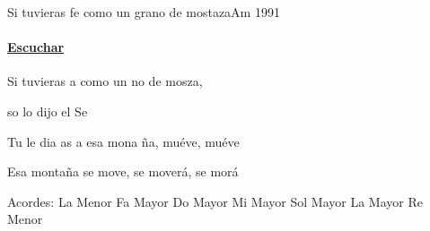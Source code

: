 \documentclass[12pt, spanish]{book}
\newcommand{\NotCCLIed}{\relax}
\begin{document}
    \begin{song}{Si tuvieras fe como un grano de mostaza}{Am}
        {1991} %
        {}
        {} %
        {} %
        \ifChordBk
        \paragraph{\mbox{}\hfill\protect\href{https://open.spotify.com/intl-es/track/082jtoJ1ot609KqSNEyhyX}{Escuchar}\mbox{}\hfill}
        \fi

        \begin{SBOpGroup}
            Si tuvieras a  como un no de mosza,

            so lo dijo el Se
        \end{SBOpGroup}

        \begin{SBOpGroup}
            Tu le dia as a esa mona ña, muéve, muéve
        \end{SBOpGroup}

        \begin{SBChorus}
            Esa montaña se move, se moverá, se morá
        \end{SBChorus}

        \ifChordBk
        \begin{SBOpGroup}
            Acordes:
            \upchord{\Am}\qquad La Menor \hfill
            \upchord{\F}\qquad Fa Mayor \hfill\null\break
            \upchord{\C}\qquad Do Mayor \hfill
            \upchord{\E}\qquad Mi Mayor \hfill\null\break
            \upchord{\G}\qquad Sol Mayor \hfill
            \upchord{\A}\qquad La Mayor \hfill
            \upchord{\Dm}\qquad Re Menor \hfill
        \end{SBOpGroup}
        \fi
    \end{song}
\end{document}
